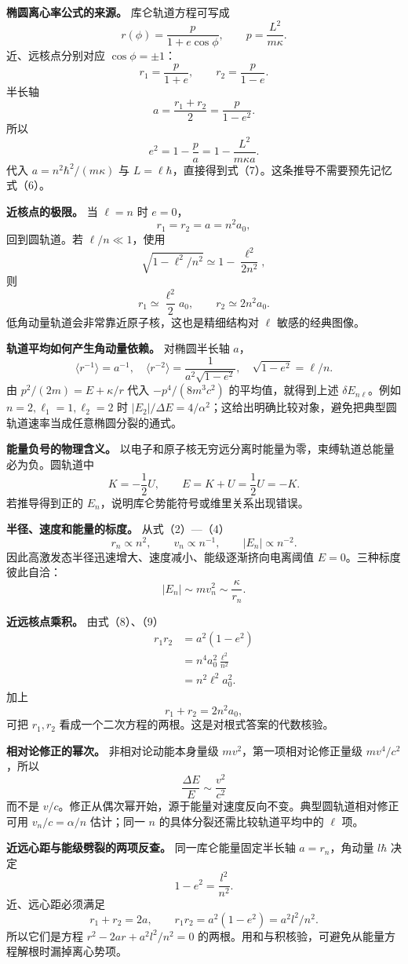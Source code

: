 \documentclass[12pt,a4paper,UTF8]{ctexart}
\begin{document}
\textbf{椭圆离心率公式的来源。} 库仑轨道方程可写成 \[
r(\phi)=\frac{p}{1+e\cos\phi},
\qquad
p=\frac{L^2}{m\kappa}.
\] 近、远核点分别对应 \(\cos\phi=\pm1\)： \[
r_1=\frac{p}{1+e},\qquad
r_2=\frac{p}{1-e}.
\] 半长轴 \[
a=\frac{r_1+r_2}{2}=\frac{p}{1-e^2}.
\] 所以 \[
e^2=1-\frac{p}{a}
=1-\frac{L^2}{m\kappa a}.
\] 代入 \(a=n^2\hbar^2/(m\kappa)\) 与
\(L=\ell\hbar\)，直接得到式（7）。这条推导不需要预先记忆式（6）。

\textbf{近核点的极限。} 当 \(\ell=n\) 时 \(e=0\)， \[
r_1=r_2=a=n^2a_0,
\] 回到圆轨道。若 \(\ell/n\ll1\)，使用 \[
\sqrt{1-\ell^2/n^2}
\simeq1-\frac{\ell^2}{2n^2},
\] 则 \[
r_1\simeq\frac{\ell^2}{2}a_0,\qquad
r_2\simeq2n^2a_0.
\] 低角动量轨道会非常靠近原子核，这也是精细结构对 \(\ell\)
敏感的经典图像。

\textbf{轨道平均如何产生角动量依赖。} 对椭圆半长轴 \(a\)， \[
\langle r^{-1}\rangle=a^{-1},\quad
\langle r^{-2}\rangle=\frac1{a^2\sqrt{1-e^2}},\quad
\sqrt{1-e^2}=\ell/n.
\] 由 \(p^2/(2m)=E+\kappa/r\) 代入 \(-p^4/(8m^3c^2)\)
的平均值，就得到上述 \(\delta E_{n\ell}\)。例如
\(n=2,\ell_1=1,\ell_2=2\) 时
\(|E_2|/\Delta E=4/\alpha^2\)；这给出明确比较对象，避免把典型圆轨道速率当成任意椭圆分裂的通式。

\textbf{能量负号的物理含义。}
以电子和原子核无穷远分离时能量为零，束缚轨道总能量必为负。圆轨道中 \[
K=-\frac12U,\qquad E=K+U=\frac12U=-K.
\] 若推导得到正的 \(E_n\)，说明库仑势能符号或维里关系出现错误。

\textbf{半径、速度和能量的标度。} 从式（2）---（4） \[
r_n\propto n^2,\qquad
v_n\propto n^{-1},\qquad
|E_n|\propto n^{-2}.
\] 因此高激发态半径迅速增大、速度减小、能级逐渐挤向电离阈值
\(E=0\)。三种标度彼此自洽： \[
|E_n|\sim mv_n^2\sim\frac{\kappa}{r_n}.
\]

\textbf{近远核点乘积。} 由式（8）、（9） \[
\begin{aligned}
r_1r_2
&=a^2(1-e^2)\\
&=n^4a_0^2\frac{\ell^2}{n^2}\\
&=n^2\ell^2a_0^2.
\end{aligned}
\] 加上 \[
r_1+r_2=2n^2a_0,
\] 可把 \(r_1,r_2\) 看成一个二次方程的两根。这是对根式答案的代数核验。

\textbf{相对论修正的幂次。} 非相对论动能本身量级
\(mv^2\)，第一项相对论修正量级 \(mv^4/c^2\)，所以 \[
\frac{\Delta E}{E}\sim\frac{v^2}{c^2}
\] 而不是
\(v/c\)。修正从偶次幂开始，源于能量对速度反向不变。典型圆轨道相对修正可用
\(v_n/c=\alpha/n\) 估计；同一 \(n\) 的具体分裂还需比较轨道平均中的
\(\ell\) 项。

\textbf{近远心距与能级劈裂的两项反查。} 同一库仑能量固定半长轴
\(a=r_n\)，角动量 \(l\hbar\) 决定 \[
1-e^2=\frac{l^2}{n^2}.
\] 近、远心距必须满足 \[
r_1+r_2=2a,\qquad r_1r_2=a^2(1-e^2)=a^2l^2/n^2.
\] 所以它们是方程 \(r^2-2ar+a^2l^2/n^2=0\)
的两根。用和与积核验，可避免从能量方程解根时漏掉离心势项。
\end{document}
